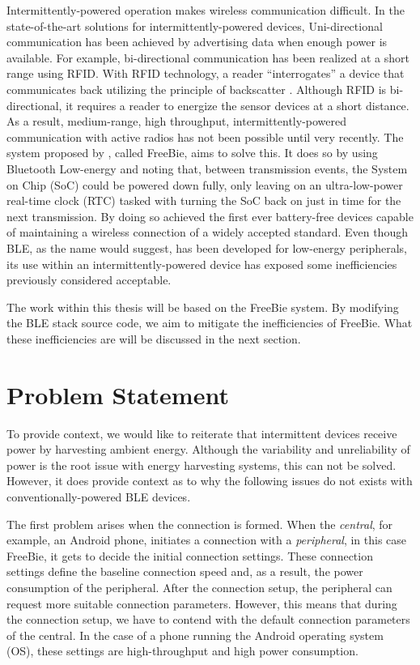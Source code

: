 Intermittently-powered operation makes wireless communication difficult. In the state-of-the-art solutions for intermittently-powered devices, Uni-directional communication has been achieved by advertising data when enough power is available. For example, bi-directional communication has been realized at a short range using RFID. With RFID technology, a reader ``interrogates'' a device that communicates back utilizing the principle of backscatter \cite{wisp_2005}. Although RFID is bi-directional, it requires a reader to energize the sensor devices at a short distance. As a result, medium-range, high throughput, intermittently-powered communication with active radios has not been possible until very recently. The system proposed by \cite{freebie}, called FreeBie, aims to solve this. It does so by using Bluetooth Low-energy and noting that, between transmission events, the System on Chip (SoC) could be powered down fully, only leaving on an ultra-low-power real-time clock (RTC) tasked with turning the SoC back on just in time for the next transmission. By doing so \cite{freebie} achieved the first ever battery-free devices capable of maintaining a wireless connection of a widely accepted standard. Even though BLE, as the name would suggest, has been developed for low-energy peripherals, its use within an intermittently-powered device has exposed some inefficiencies previously considered acceptable.

The work within this thesis will be based on the FreeBie system. By modifying the BLE stack source code, we aim to mitigate the inefficiencies of FreeBie. What these inefficiencies are will be discussed in the next section.

\section*{Problem Statement}
\label{sec:introduction_problem_statement}

To provide context, we would like to reiterate that intermittent devices receive power by harvesting ambient energy. Although the variability and unreliability of power is the root issue with energy harvesting systems, this can not be solved. However, it does provide context as to why the following issues do not exists with conventionally-powered BLE devices.

The first problem arises when the connection is formed. When the \textit{central}, for example, an Android phone, initiates a connection with a \textit{peripheral}, in this case FreeBie, it gets to decide the initial connection settings. These connection settings define the baseline connection speed and, as a result, the power consumption of the peripheral. After the connection setup, the peripheral can request more suitable connection parameters. However, this means that during the connection setup, we have to contend with the default connection parameters of the central. In the case of a phone running the Android operating system (OS), these settings are high-throughput and high power consumption. 

